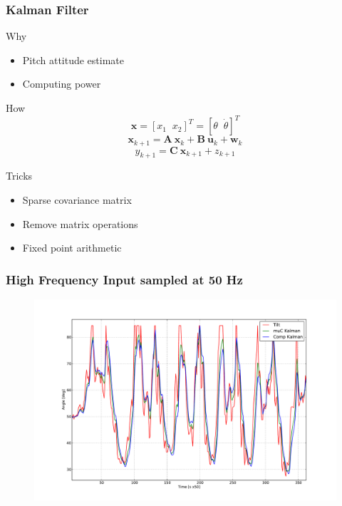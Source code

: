 \begin{frame}
\frametitle{Kalman Filter}
\begin{block}{Why}
\begin{itemize}
\item
Pitch attitude estimate
\item
Computing power
\end{itemize}
\end{block}

\begin{block}{How}
\begin{equation*}
\bm{x} = [x_1\;\;x_2]^T = [\theta\;\;\dot{\theta}]^T
\end{equation*}
\vspace{0.075in}
\begin{equation*}
\bm{x}_{k+1} = \bm{A}\:\bm{x}_k + \bm{B}\:\bm{u}_k + \bm{w}_k
\end{equation*}
\vspace{0.075in}
\begin{equation*}
y_{k+1} = \bm{C}\:\bm{x}_{k+1} + z_{k+1}
\end{equation*}
\end{block}

\begin{block}{Tricks}
\begin{itemize}
\item
\alert{Sparse covariance matrix}
\item
Remove matrix operations
\item
\alert{Fixed point arithmetic}
\end{itemize}
\end{block}
\end{frame}

\begin{frame}
\frametitle{High Frequency Input sampled at 50 Hz}
\begin{figure}
\centering
\includegraphics[width=\textwidth]{fig/kf_fp_hf.pdf}
\end{figure}
\end{frame}
